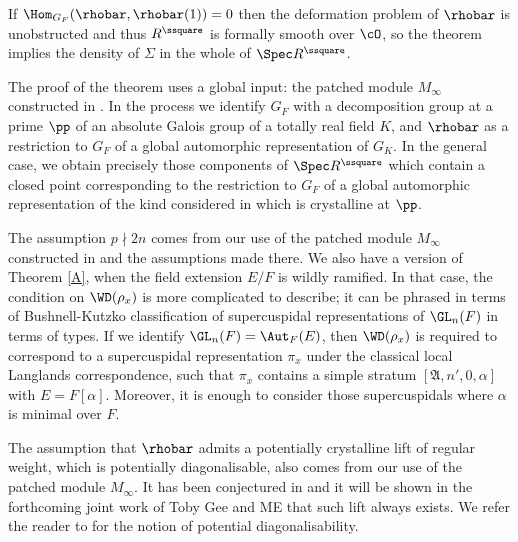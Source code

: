 \begin{remark} If $\Hom_{G_F}(\rhobar, \rhobar(1))=0$ then the deformation problem of $\rhobar$ is unobstructed and thus $R^\ssquare$ is formally smooth over $\cO$, so the theorem
implies the density of $\Sigma$ in the whole of $\Spec R^\ssquare$.
\end{remark}

\begin{remark} The proof of the theorem uses a global input: the patched module $M_\infty$ constructed in
\cite{six-authors}. In the process we identify $G_F$ with a decomposition group at a prime $\pp$ of an absolute Galois group of a totally real field $K$, and $\rhobar$ as a restriction to $G_F$ of a global automorphic representation of $G_K$. In the general case, we obtain precisely those components of $\Spec R^\ssquare$ which contain a closed point corresponding to the restriction to $G_F$
of a global automorphic representation of the kind considered in \cite[\S 2.4]{six-authors} which is crystalline at $\pp$.
\end{remark}

\begin{remark} The assumption $p \nmid 2n$ comes from our use of the patched
module $M_{\infty}$ constructed in \cite{six-authors} and the assumptions made there. We also have a version of Theorem \ref{A}, when the field extension $E/F$ is wildly ramified. In that case, the condition on $\WD(\rho_x)$ is more complicated to describe; it can be phrased in terms of Bushnell-Kutzko classification of supercuspidal representations of
$\GL_n(F)$ in terms of types. If we identify $\GL_n(F)=\Aut_F(E)$, then $\WD(\rho_x)$ is required to correspond to a supercuspidal representation $\pi_x$ under the classical local
Langlands correspondence, such that $\pi_x$ contains a simple stratum $[\mathfrak A, n', 0, \alpha]$ with $E=F[\alpha]$. Moreover, it is enough to consider those supercuspidals where $\alpha$ is minimal over $F$.
\end{remark}

\begin{remark}\label{vac} The assumption that $\rhobar$ admits a potentially crystalline lift of regular weight, which is
potentially diagonalisable, also comes from our use of the patched module $M_{\infty}$. It has been conjectured in \cite{BMcycles} and it will be shown in the forthcoming joint work of Toby Gee and ME that such lift always exists. We refer the reader to \cite[\S 1.4]{BLGGT} for the notion of potential diagonalisability.
\end{remark}

